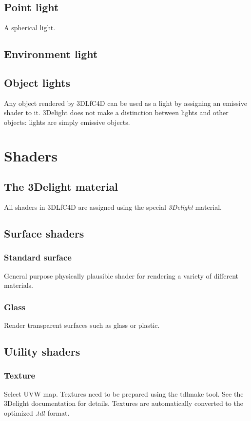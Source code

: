 \documentclass{book}
\begin{document}
\subsection{Point light}
A spherical light. 

\subsection{Environment light}

\subsection{Object lights}
Any object rendered by 3DLfC4D can be used as a light by assigning an emissive shader to it. 3Delight does not make a distinction between lights and other objects: lights are simply emissive objects. 

\section{Shaders}
\subsection{The 3Delight material}
All shaders in 3DLfC4D are assigned using the special \emph{3Delight} material. 

\subsection{Surface shaders}
\subsubsection{Standard surface}
General purpose physically plausible shader for rendering a variety of different materials.

\subsubsection{Glass}
Render transparent surfaces such as glass or plastic. 

\subsection{Utility shaders}
\subsubsection{Texture}
Select UVW map. Textures need to be prepared using the tdlmake tool. See the 3Delight documentation for details. Textures are automatically converted to the optimized $.tdl$ format.  
\end{document}
